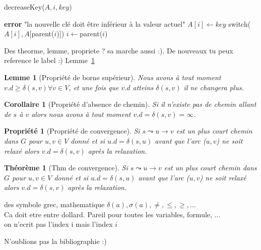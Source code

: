 \documentclass[12pt,a4paper,final]{article}
\newtheorem{prop}{Propriété}
\newtheorem{corollaire}{Corollaire}
\newtheorem{lemme}{Lemme}
\newtheorem{thm}{Théorème}
\begin{document}
\begin{algorithm}[H]
\caption{decreaseKey($A,i,key$)}\label{heapify}
\begin{algorithmic}[1]
\STATE \textbf{error} "la nouvelle clé doit être inférieur à la valeur actuel"
\ENDIF
\STATE $A[i]\gets key$
\STATE switch($A[i],A[$parent($i$)$]$)
\STATE $i\gets $parent($i$)
\ENDWHILE
\end{algorithmic}
\end{algorithm}

Des theorme, lemme, propriete ? sa marche aussi :). De nouveaux tu peux reference le label :) Lemme~\ref{upper-bound_prop}

\begin{lemme}[Propriété de borne supérieur]\label{upper-bound_prop}
Nous avons à tout moment $v.d \geq \delta(s,v) \forall v \in V$, et une fois que $v.d$ atteins $\delta(s,v)$ il ne changera plus.
\end{lemme}

\begin{corollaire}[Propriété d'absence de chemin]\label{no_path_prop}
Si il n'existe pas de chemin allant de $s$ à $v$ alors nous avons à tout moment $v.d = \delta(s,v) = \infty$.
\end{corollaire}

\begin{prop}[Propriété de convergence]\label{convergence_prop}
Si $s \leadsto u \rightarrow v$ est un plus court chemin dans $G$ pour $u, v \in V$ donné et si $u.d = \delta(s,u)$ avant que l'arc ($u,v$) ne soit relaxé alors $v.d = \delta(s,v)$ après la relaxation.
\end{prop}

\begin{thm}[Thm de convergence]\label{convergence_thm}
Si $s \leadsto u \rightarrow v$ est un plus court chemin dans $G$ pour $u, v \in V$ donné et si $u.d = \delta(s,u)$ avant que l'arc ($u,v$) ne soit relaxé alors $v.d = \delta(s,v)$ après la relaxation.
\end{thm}

des symbole grec, mathematique $\delta(a), \sigma(a), \neq, \leq, \geq, ...$\\
Ca doit etre entre dollard. Pareil pour toutes les variables, formule, ...\\
on n'ecrit pas l'index i mais l'index $i$

N'oublions pas la bibliographie :)



\end{document}
